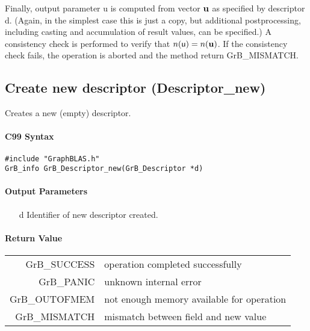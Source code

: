 \documentclass[11pt]{extarticle}
\begin{document}
Finally, output parameter {\sf u} is computed from vector ${\bf u}$ as
specified by descriptor {\sf d}. (Again, in the simplest case this is just
a copy, but additional postprocessing, including casting and accumulation
of result values, can be specified.)  A consistency check is performed
to verify that $n({\sf u}) = n({\bf u})$. If the consistency check
fails, the operation is aborted and the method return {\sf GrB\_MISMATCH}.



\subsection{Create new descriptor ({\sf Descriptor\_new})}

Creates a new (empty) descriptor.

\paragraph{C99 Syntax}

\begin{verbatim}
#include "GraphBLAS.h"
GrB_info GrB_Descriptor_new(GrB_Descriptor *d)
\end{verbatim}

\paragraph{Output Parameters}

\begin{itemize}
	\item[{\sf d}] Identifier of new descriptor created.
\end{itemize}

\paragraph{Return Value}

\begin{tabular}{rl} 
{\sf GrB\_SUCCESS} 	& operation completed successfully \\
{\sf GrB\_PANIC}	& unknown internal error \\
{\sf GrB\_OUTOFMEM}	& not enough memory available for operation \\
{\sf GrB\_MISMATCH}	& mismatch between field and new value
\end{tabular}
\end{document}
